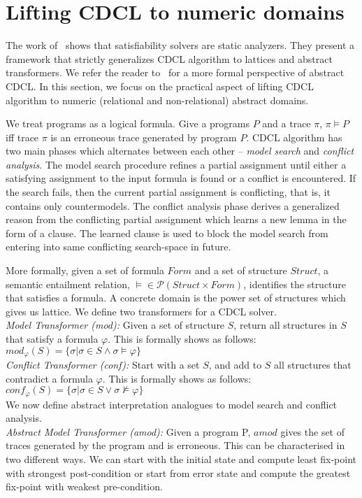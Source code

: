 \section{Lifting CDCL to numeric domains}
The work of~\cite{dhk2013-popl,sas12,tacas12} shows that 
satisfiability solvers are static analyzers. They present 
a framework that strictly generalizes CDCL algorithm to 
lattices and abstract transformers. We refer the reader 
to~\cite{dhk2013-popl} for a more formal perspective of 
abstract CDCL.  In this section, we focus on the practical 
aspect of lifting CDCL algorithm to numeric (relational and 
non-relational) abstract domains.   

We treat programs as a logical formula. Give a programs $P$ and a trace $\pi$,
$\pi \models P$ iff trace $\pi$ is an erroneous trace generated by program
$P$. 
CDCL algorithm has two main phases which alternates between each 
other -- {\em model search} and {\em conflict analysis}. The model 
search procedure refines a partial assignment until either a satisfying 
assignment to the input formula is found or a conflict is encountered.  
If the search fails, then the current partial assignment is 
conflicting, that is, it contains only countermodels.  The conflict 
analysis phase derives a generalized reason from the conflicting partial 
assignment which learns a new lemma in the form of a clause. The learned 
clause is used to block the model search from entering into same conflicting 
search-space in future. 

More formally, given a set of formula $Form$ and a set of structure $Struct$, a semantic entailment relation, $\models \in \mathcal{P}(Struct \times Form)$, identifies the structure that satisfies a formula. A concrete domain is the power set of structures which gives us lattice. 
We define two transformers for a CDCL solver. \\
\textit{Model Transformer (mod):} Given a set of structure $S$, return all structures 
in $S$ that satisfy a formula $\varphi$. This is formally shows as follows:
$mod_{\varphi}(S) = \{\sigma | \sigma \in S \wedge \sigma \models \varphi\}$ \\

\textit{Conflict Transformer (conf):} Start with a set $S$, and add to $S$ all structures 
that contradict a formula $\varphi$. This is formally shows as follows:
$conf_{\varphi}(S) = \{\sigma | \sigma \in S \vee \sigma \not\models \varphi\}$
\\
We now define abstract interpretation analogues to model search and conflict analysis.   \\
\textit{Abstract Model Transformer (amod):} Given a program P, $amod$ gives the 
set of traces generated by the program and is erroneous. This can be
characterised in two different ways. We can start with the initial state and
compute least fix-point with strongest post-condition or start from error state 
and compute the greatest fix-point with weakest pre-condition. \\

